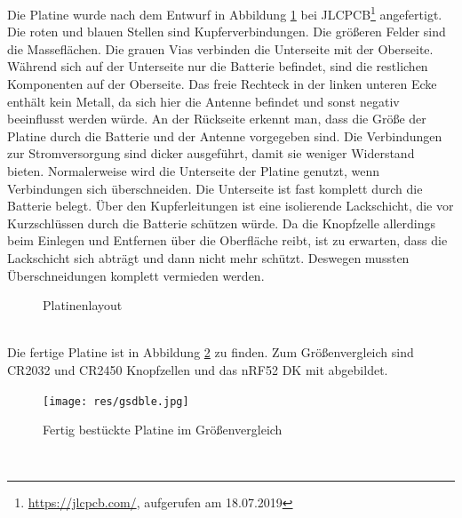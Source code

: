 Die Platine wurde nach dem Entwurf in Abbildung \ref{fig:platinenlayout} bei JLCPCB\footnote{\url{https://jlcpcb.com/}, aufgerufen am 18.07.2019} angefertigt.
Die roten und blauen Stellen sind Kupferverbindungen.
Die größeren Felder sind die Masseflächen.
Die grauen Vias verbinden die Unterseite mit der Oberseite.
Während sich auf der Unterseite nur die Batterie befindet, sind die restlichen Komponenten auf der Oberseite.
Das freie Rechteck in der linken unteren Ecke enthält kein Metall, da sich hier die Antenne befindet und sonst negativ beeinflusst werden würde.
An der Rückseite erkennt man, dass die Größe der Platine durch die Batterie und der Antenne vorgegeben sind.
Die Verbindungen zur Stromversorgung sind dicker ausgeführt, damit sie weniger Widerstand bieten.
Normalerweise wird die Unterseite der Platine genutzt, wenn Verbindungen sich überschneiden.
Die Unterseite ist fast komplett durch die Batterie belegt.
Über den Kupferleitungen ist eine isolierende Lackschicht, die vor Kurzschlüssen durch die Batterie schützen würde.
Da die Knopfzelle allerdings beim Einlegen und Entfernen über die Oberfläche reibt, ist zu erwarten, dass die Lackschicht sich abträgt und dann nicht mehr schützt.
Deswegen mussten Überschneidungen komplett vermieden werden.
\begin{figure}[hbtp]
	\centering
	\caption{Platinenlayout}
	\label{fig:platinenlayout}
\end{figure}\\
Die fertige Platine ist in Abbildung \ref{fig:platine} zu finden.
Zum Größenvergleich sind CR2032 und CR2450 Knopfzellen und das nRF52 DK mit abgebildet.
\begin{figure}[hbtp]
	\centering
	\texttt{[image: res/gsdble.jpg]}
	\caption{Fertig bestückte Platine im Größenvergleich}
	\label{fig:platine}
\end{figure}\\

